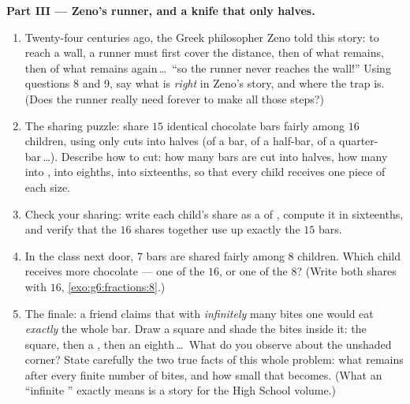 \begin{problem}
\medskip
\noindent\textbf{Part III --- Zeno's runner, and a knife that
only halves.}
\begin{enumerate}[resume]
  \item Twenty-four centuries ago, the Greek philosopher Zeno
        told this story: to reach a wall, a runner must first
        cover  the distance, then  of what remains, then
         of what remains again\,\dots\ ``so the runner never
        reaches the wall!'' Using questions 8 and 9, say what is
        \emph{right} in Zeno's story, and where the trap is.
        (Does the runner really need forever to make all those
        steps?)
  \item The sharing puzzle: share $15$ identical chocolate bars
        fairly among $16$ children, using only cuts into halves
        (of a bar, of a half-bar, of a quarter-bar\,\dots).
        Describe how to cut: how many bars are cut into halves,
        how many into , into eighths, into sixteenths,
        so that every child receives one piece of each size.
  \item Check your sharing: write each child's share as a  of
        , compute it in sixteenths, and verify that the
        $16$ shares together use up exactly the $15$ bars.
  \item In the class next door, $7$ bars are shared fairly among
        $8$ children. Which child receives more chocolate --- one
        of the $16$, or one of the $8$? (Write both shares with
         $16$, \cref{exo:g6:fractions:8}.)
  \item The finale: a friend claims that with \emph{infinitely}
        many bites one would eat \emph{exactly} the whole bar.
        Draw a square and shade the bites inside it:  the
        square, then a , then an eighth\,\dots\ What do
        you observe about the unshaded corner? State carefully
        the two true facts of this whole problem: what remains
        after every finite number of bites, and how small that
         becomes. (What an ``infinite '' exactly
        means is a story for the High School volume.)
\end{enumerate}
\end{problem}
